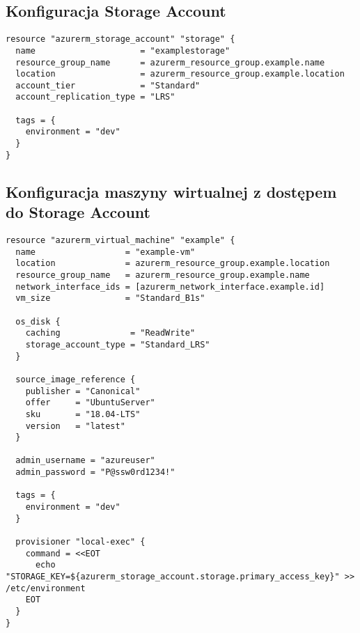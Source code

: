 \documentclass{article}
\begin{document}
\subsection{Konfiguracja Storage Account}
\begin{lstlisting}
resource "azurerm_storage_account" "storage" {
  name                     = "examplestorage"
  resource_group_name      = azurerm_resource_group.example.name
  location                 = azurerm_resource_group.example.location
  account_tier             = "Standard"
  account_replication_type = "LRS"

  tags = {
    environment = "dev"
  }
}
\end{lstlisting}

\subsection{Konfiguracja maszyny wirtualnej z dostępem do Storage Account}
\begin{lstlisting}
resource "azurerm_virtual_machine" "example" {
  name                  = "example-vm"
  location              = azurerm_resource_group.example.location
  resource_group_name   = azurerm_resource_group.example.name
  network_interface_ids = [azurerm_network_interface.example.id]
  vm_size               = "Standard_B1s"

  os_disk {
    caching              = "ReadWrite"
    storage_account_type = "Standard_LRS"
  }

  source_image_reference {
    publisher = "Canonical"
    offer     = "UbuntuServer"
    sku       = "18.04-LTS"
    version   = "latest"
  }

  admin_username = "azureuser"
  admin_password = "P@ssw0rd1234!"

  tags = {
    environment = "dev"
  }

  provisioner "local-exec" {
    command = <<EOT
      echo "STORAGE_KEY=${azurerm_storage_account.storage.primary_access_key}" >> /etc/environment
    EOT
  }
}
\end{lstlisting}
\end{document}
